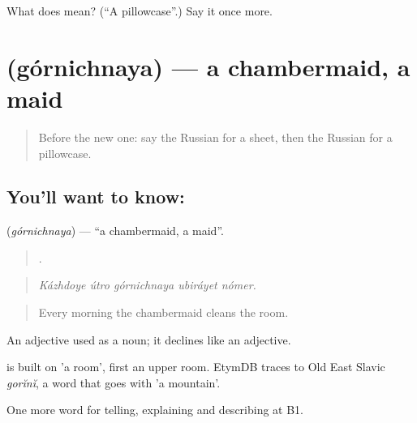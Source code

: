 \begin{tcolorbox}[breakable,colback=teal!4,colframe=teal!35!black,title={Before you move on}]
What does  mean? (\textquotedblleft{}A pillowcase\textquotedblright{}.) Say it once more.
\end{tcolorbox}
\section[\texorpdfstring{\ru{горничная} (górnichnaya)}{горничная (górnichnaya)}]{ (górnichnaya) — a chambermaid, a maid}

\label{lesson:RU-C430-gornichnaya}



\begin{quote}
Before the new one: say the Russian for a sheet, then the Russian for a pillowcase.
\end{quote}

\subsection*{You'll want to know: }
\textbf{} (\emph{górnichnaya}) — \textquotedblleft{}a chambermaid, a maid\textquotedblright{}.

\begin{quote}
    .
\end{quote}

\begin{quote}
\emph{Kázhdoye útro górnichnaya ubiráyet nómer.}
\end{quote}

\begin{quote}
Every morning the chambermaid cleans the room.
\end{quote}

An adjective used as a noun; it declines like an adjective.

\begin{cousinweb}
\emph{} is built on \emph{} 'a room', first an upper room. EtymDB traces \emph{} to Old East Slavic \emph{gorĭnĭ}, a word that goes with \emph{} 'a mountain'.
\end{cousinweb}

\begin{grammarlens}[title={What you've built}]
One more word for telling, explaining and describing at B1.
\end{grammarlens}

